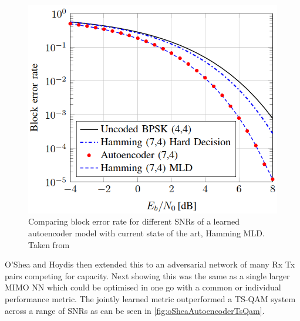 \documentclass[12pt,onecolumn,letterpaper]{article}
\newcommand\genfigsize{0.5}
\begin{document}
\begin{figure}[t]
   \centering
   \includegraphics[width=\genfigsize\linewidth]{figures/oShea_autoencoder_hamming_comp.PNG}
   \caption{Comparing block error rate for different SNRs of a learned autoencoder model with current state of the art, Hamming MLD. Taken from~\cite{oShea}}
   \label{fig:oSheaAutoencoderHamming}
\end{figure}

O'Shea and Hoydis then extended this to an adversarial network of many Rx Tx pairs competing for capacity. Next showing this was the same as a single larger MIMO NN which could be optimised in one go with a common or individual performance metric. The jointly learned metric outperformed a TS-QAM system across a range of SNRs as can be seen in \ref{fig:oSheaAutoencoderTsQam}.
\end{document}
